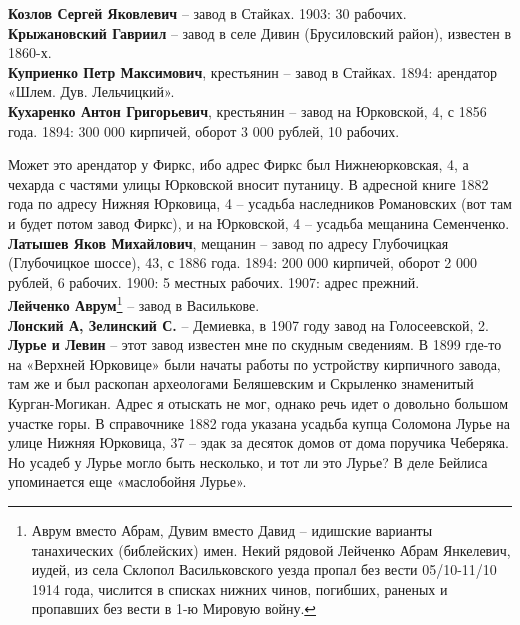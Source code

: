 
\noindent\textbf{Козлов Сергей Яковлевич} – завод в Стайках. 1903: 30 рабочих.\\

\noindent\textbf{Крыжановский Гавриил} – завод в селе Дивин (Брусиловский район), известен в 1860-х.\\

\noindent\textbf{Куприенко Петр Максимович}, крестьянин – завод в Стайках. 1894: арендатор «Шлем. Дув. Лельчицкий».\\

\noindent\textbf{Кухаренко Антон Григорьевич}, крестьянин – завод на Юрковской, 4, с 1856 года. 1894: 300 000 кирпичей, оборот 3 000 рублей, 10 рабочих. 

Может это арендатор у Фиркс, ибо адрес Фиркс был Нижнеюрковская, 4, а чехарда с частями улицы Юрковской вносит путаницу. В адресной книге 1882 года по адресу Нижняя Юрковица, 4 – усадьба наследников Романовских (вот там и будет потом завод Фиркс), и на Юрковской, 4 – усадьба мещанина Семенченко.\\

\noindent\textbf{Латышев Яков Михайлович}, мещанин – завод по адресу Глубочицкая (Глубочицкое шоссе), 43, с 1886 года. 1894: 200 000 кирпичей, оборот 2 000 рублей, 6 рабочих. 1900: 5 местных рабочих. 1907: адрес прежний.\\

\noindent\textbf{Лейченко Аврум}\footnote{Аврум вместо Абрам, Дувим вместо Давид – идишские варианты танахических (библейских) имен. Некий рядовой Лейченко Абрам Янкелевич, иудей, из села Склопол Васильковского уезда пропал без вести 05/10-11/10 1914 года, числится в списках нижних чинов, погибших, раненых и пропавших без вести в 1-ю Мировую войну.} – завод в Василькове.\\

\noindent\textbf{Лонский А, Зелинский С.} – Демиевка, в 1907 году завод на Голосеевской, 2.\\ 

\noindent\textbf{Лурье и Левин} – этот завод известен мне по скудным сведениям. В 1899 где-то на «Верхней Юрковице» были начаты работы по устройству кирпичного завода, там же и был раскопан археологами Беляшевским и Скрыленко знаменитый Курган-Могикан. Адрес я отыскать не мог, однако речь идет о довольно большом участке горы. В справочнике 1882 года указана усадьба купца Соломона Лурье на улице Нижняя Юрковица, 37 – эдак за десяток домов от дома поручика Чеберяка. Но усадеб у Лурье могло быть несколько, и тот ли это Лурье? В деле Бейлиса упоминается еще «маслобойня Лурье».

